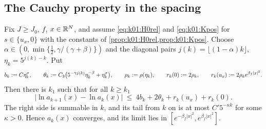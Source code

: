\subsection{The Cauchy property in the spacing}\label{ssec:k01:CA}

\begin{theorem}\label{thm:k01:CA}
Fix $J\ge J_0$, $f$, $x\in\mathbb R^N$, and assume \eqref{eq:k01:H0rel} and \eqref{eq:k01:Kpos} for $s\in\{u_x,0\}$ with the constants of \cref{prop:k01:H0rel,prop:k01:Kpos}. Choose $\alpha\in(0,\min\{\frac12,\gamma/(\gamma+\beta)\})$ and the diagonal pairs $j(k)=\lfloor(1-\alpha)k\rfloor$, $\eta_k=5^{j(k)-k}$. Put
\[
b_k:= C\eta_k^{\sigma},\qquad \theta_k:= C_3\big(5^{-\gamma j(k)}\eta_k^{-\beta}+\eta_k^{\sigma}\big),\qquad \rho_k:=\rho(\eta_k),\qquad r_k(0):=2\rho_k,\qquad r_k(u_x):=2\rho_ke^{\beta_f|x|^2}.
\]
Then there is $k_1$ such that for all $k\ge k_1$
\begin{equation}\label{eq:k01:CA}
\big|\ln a_{k+1}(x)-\ln a_k(x)\big|\ \le\ 4b_k+2\theta_k+r_k(u_x)+r_k(0).
\end{equation}
The right side is summable in $k$, and its tail from $k$ on is at most $C'5^{-\kappa k}$ for some $\kappa>0$. Hence $a_k(x)$ converges, and its limit lies in $[e^{-\beta_f|x|^2},e^{\beta_f|x|^2}]$.
\end{theorem}

